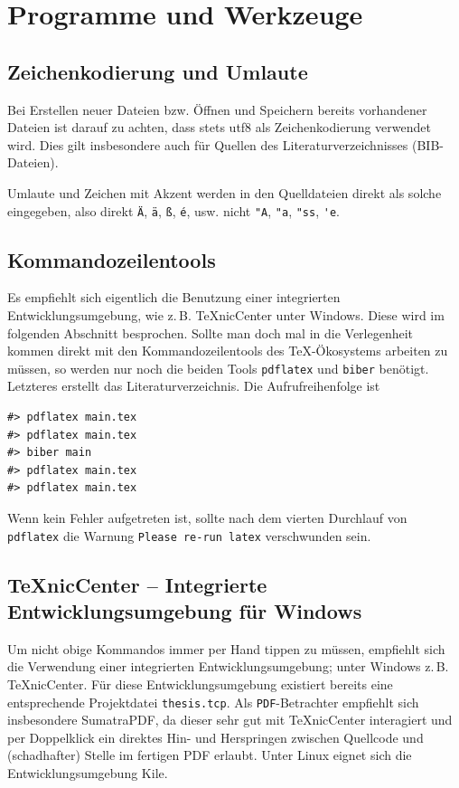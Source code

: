 \chapter{Programme und Werkzeuge}

\section{Zeichenkodierung und Umlaute}

Bei Erstellen neuer Dateien bzw. Öffnen und Speichern bereits vorhandener
Dateien ist darauf zu achten, dass stets \gls{utf8} als
Zeichenkodierung verwendet wird. Dies gilt insbesondere
auch für Quellen des Literaturverzeichnisses (BIB-Dateien).

Umlaute und Zeichen mit Akzent werden in den Quelldateien direkt
als solche eingegeben, also direkt \verb#Ä#, \verb#ä#, \verb#ß#, \verb#é#, usw. nicht
\verb#"A#, \verb#"a#, \verb#"ss#, \verb#'e#.

\section{Kommandozeilentools}

Es empfiehlt sich eigentlich die Benutzung einer integrierten
Entwicklungsumgebung, wie z.\,B. TeXnicCenter unter Windows. Diese wird im
folgenden Abschnitt besprochen. Sollte man doch mal in die Verlegenheit kommen
direkt mit den Kommandozeilentools des TeX-Ökosystems arbeiten zu müssen, so
werden nur noch die beiden Tools \texttt{pdflatex} und \texttt{biber} benötigt.
Letzteres erstellt das Literaturverzeichnis. Die Aufrufreihenfolge ist
\begin{verbatim}
#> pdflatex main.tex
#> pdflatex main.tex
#> biber main
#> pdflatex main.tex
#> pdflatex main.tex
\end{verbatim}
Wenn kein Fehler aufgetreten ist, sollte nach dem vierten Durchlauf
von \texttt{pdflatex} die Warnung
\texttt{Please re-run latex} verschwunden sein.

\section{TeXnicCenter -- Integrierte Entwicklungsumgebung für Windows}

Um nicht obige Kommandos immer per Hand tippen zu müssen, empfiehlt sich die
Verwendung einer integrierten
Entwicklungsumgebung; unter 
Windows z.\,B. TeXnicCenter. Für diese Entwicklungsumgebung existiert bereits
eine entsprechende Projektdatei \texttt{thesis.tcp}. Als \texttt{PDF}-Betrachter empfiehlt sich
insbesondere SumatraPDF, da dieser sehr gut mit TeXnicCenter interagiert und
per Doppelklick ein direktes Hin- und Herspringen zwischen Quellcode und
(schadhafter) Stelle im fertigen PDF erlaubt. Unter Linux eignet
sich die Entwicklungsumgebung Kile.

